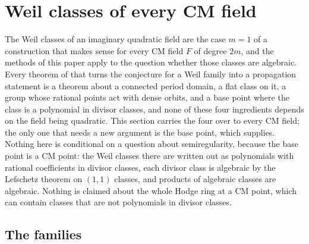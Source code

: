 \section{Weil classes of every CM field}\label{sec:cmfields}

The Weil classes of an imaginary quadratic field are the case $m=1$ of a
construction that makes sense for every CM field $F$ of degree $2m$, and the
methods of this paper apply to the question whether those classes are
algebraic. Every theorem of  that turns the conjecture
for a Weil family into a propagation statement is a theorem about a connected
period domain, a flat class on it, a group whose rational points act with
dense orbits, and a base point where the class is a polynomial in divisor
classes, and none of these four ingredients depends on the field being
quadratic. This section carries the four over to every CM field; the only
one that needs a new argument is the base point, which
 supplies. Nothing here is conditional on a question
about semiregularity, because the base point is a CM point: the Weil classes
there are written out as polynomials with rational coefficients in divisor
classes, each divisor class is algebraic by the Lefschetz theorem on $(1,1)$
classes, and products of algebraic classes are algebraic. Nothing is claimed
about the
whole Hodge ring at a CM point, which can contain classes that are not
polynomials in divisor classes.

\subsection{The families}

